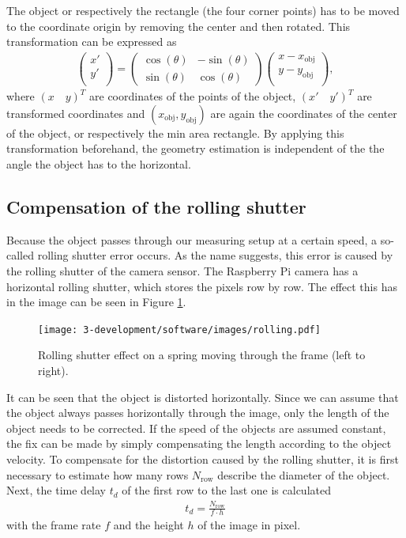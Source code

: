The object or respectively the rectangle (the four corner points) has to be moved to the coordinate origin by removing the center and then rotated.
This transformation can be expressed as
\begin{align*}
	\begin{pmatrix}
	x'\\
	y'\\
	\end{pmatrix}=
	\begin{pmatrix}
	\cos(\theta)&-\sin(\theta)\\
	\sin(\theta)&\cos(\theta)
	\end{pmatrix}
	\begin{pmatrix}
	x-x_{\text{obj}}\\
	y-y_{\text{obj}}\\
	\end{pmatrix},	
\end{align*}
where $(x\quad y)^T$ are coordinates of the points of the object, $(x'\quad y')^T$ are transformed coordinates and $(x_{\text{obj}}, y_{\text{obj}})$ are again the coordinates of the center of the object, or respectively the min area rectangle.
By applying this transformation beforehand, the geometry estimation is independent of the the angle the object has to the horizontal. 

\newpage
\subsection{Compensation of the rolling shutter}
Because the object passes through our measuring setup at a certain speed, a so-called rolling shutter error occurs. 
As the name suggests, this error is caused by the rolling shutter of the camera sensor. 
The Raspberry Pi camera has a horizontal rolling shutter, which stores the pixels row by row.
The effect this has in the image can be seen in Figure \ref{development:rolling}.
\begin{figure}[ht]
	\centering
	\texttt{[image: 3-development/software/images/rolling.pdf]}
	\caption{Rolling shutter effect on a spring moving through the frame (left to right).\label{development:rolling}}
\end{figure}
It can be seen that the object is distorted horizontally.
Since we can assume that the object always passes horizontally through the image, only the length of the object needs to be corrected.
If the speed of the objects are assumed constant, the fix can be made by simply compensating the length according to the object velocity.
To compensate for the distortion caused by the rolling shutter, it is first necessary to estimate how many rows $N_{\text{row}}$ describe the diameter of the object.
Next, the time delay $t_d$ of the first row to the last one is calculated 
\begin{align*}
t_d = \frac{N_{\text{row}}}{f \cdot h}
\end{align*}
with the frame rate $f$ and the height $h$ of the image in pixel.

